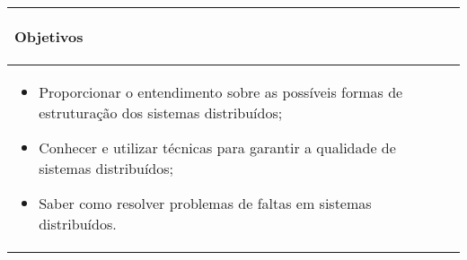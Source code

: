 \hspace{1cm}
\begin{table}[h!]
\centering
\begin{small} 
\setlength{\tabcolsep}{3pt} 
\begin{tabular}{|p{15cm}|}\hline

\begin{center}\textbf{Objetivos}\end{center}\\ \hline
\begin{itemize}
\item Proporcionar o entendimento sobre as possíveis formas de estruturação dos sistemas distribuídos;
\item Conhecer e utilizar técnicas para garantir a qualidade de sistemas distribuídos;
\item Saber como resolver problemas de faltas em sistemas distribuídos.
\end{itemize}
 \\ \hline

\end{tabular} 
\end{small}
\label{dadosinstituicao}
\end{table}

